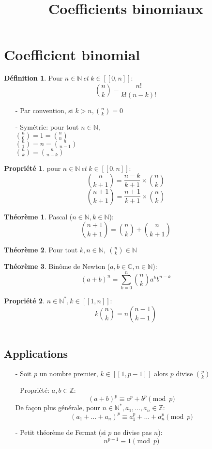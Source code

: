\documentclass[fleqn]{article}
\title{Coefficients binomiaux}
\date{}
\theoremstyle{definition} \newtheorem*{defi}{D\'efinition}
\theoremstyle{definition} \newtheorem*{theo}{Th\'eor\`eme}
\theoremstyle{definition} \newtheorem*{prop}{Propri\'et\'e}
\begin{document}
\maketitle

\section{Coefficient binomial}
\begin{defi}
	Pour \(n \in \mathbb{N}\ et\ k \in [\![0,n]\!]\): \\
	\[ \binom{n}{k} = \frac{n!}{k!(n-k)!} \]
\end{defi}
\begin{itemize}
	\item [-] Par convention, si $k>n, \binom{n}{k} = 0$
	\item [-] Sym\'etrie: pour tout \(n \in \mathbb{N},\) \\
		$\binom{n}{0} = 1 = \binom{n}{n}$ \\
		$\binom{n}{1} = n = \binom{n}{n-1}$ \\
		$\binom{n}{k} = \binom{n}{n-k}$
\end{itemize}
\begin{prop} pour \(n \in \mathbb{N}\ et\ k \in [\![0,n]\!]\):
	\[\binom{n}{k+1} = \frac{n-k}{k+1} \times \binom{n}{k} \]
	\[\binom{n+1}{k+1} = \frac{n+1}{k+1} \times \binom{n}{k} \]
\end{prop}
\begin{theo} Pascal (\(n \in \mathbb{N}, k \in \mathbb{N}\)): \\
	\[\binom{n+1}{k+1} = \binom{n}{k} + \binom{n}{k+1}\]
\end{theo}
\begin{theo}
	Pour tout \(k,n \in \mathbb{N},\ \binom{n}{k} \in \mathbb{N}\)
\end{theo}
\begin{theo} Bin\^{o}me de Newton (\(a,b \in \mathbb{C}, n \in \mathbb{N}\)):
	\[(a+b)^n = \sum_{k=0}^{n} \binom{n}{k}a^kb^{n-k}\]
\end{theo}
\begin{prop} \(n \in \mathbb{N}^*, k \in [\![1,n]\!]\): \\
	\[k\binom{n}{k} = n\binom{n-1}{k-1}\] \\
\end{prop}

\subsection{Applications}
\begin{itemize}
	\item [-] Soit \(p\) un nombre premier, \(k \in [\![1,p-1]\!]\) alors \(p\) divise \(\binom{p}{k}\)
	\item [-] Propri\'{e}t\'{e}: \(a,b \in \mathbb{Z}\):
		\[(a+b)^p \equiv a^p + b^p \pmod{p}\]
		De fa\c{c}on plus g\'en\'erale, pour \(n \in \mathbb{N}^*, a_1, \hdots, a_n \in \mathbb{Z}\):
		\[(a_1+\hdots+a_n)^p \equiv a_1^p+\hdots+a_n^p \pmod{p}\]
	\item [-] Petit th\'eor\`eme de Fermat (si \(p\) ne divise pas \(n\)):
		\[n^{p-1} \equiv 1\pmod{p} \]
\end{itemize}
\end{document}
